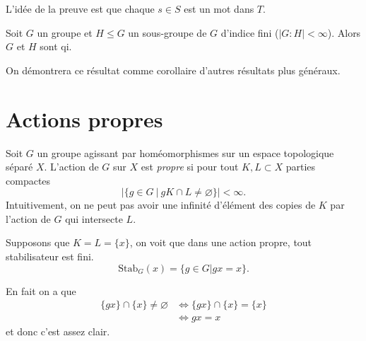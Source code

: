   \begin{preuve}
    L'idée de la preuve est que chaque $s \in S$ est un mot dans $T$.
  \end{preuve}


  \begin{prop}
    Soit $G$ un groupe et $H \leq G$ un sous-groupe de $G$ d'indice fini ($|G:H| < \infty$). Alors $G$ et $H$
    sont qi.
  \end{prop}

  \begin{preuve}
    On démontrera ce résultat comme corollaire d'autres résultats plus généraux.
  \end{preuve}

  
  
  \section{Actions propres}
  \label{sec:actions-propres}

  \begin{defi}
    Soit $G$ un groupe agissant par homéomorphismes sur un espace topologique séparé $X$. L'action de $G$ sur
    $X$ est \emph{propre}  si pour tout $K, L \subset X$ parties compactes 
      \[\left| \{g \in G\ |\ gK \cap L \neq \varnothing \}\right| < \infty.\]
    Intuitivement, on ne peut pas avoir une infinité d'élément des copies de $K$ par l'action de $G$ qui
    intersecte $L$.
  \end{defi}

  \begin{prop}
    Supposons que $K = L = \{x\}$, on voit que dans une action propre, tout stabilisateur est fini.
      \[\mathrm{Stab}_G(x) = \{g \in G | gx = x\}.\]
  \end{prop}

  \begin{preuve}
    En fait on a que
    {
      \begin{align*}
        \{gx\} \cap \{x\} \neq \varnothing &\iff \{gx\} \cap \{x\} = \{x\}\\
        & \iff gx = x
      \end{align*}}
    et donc c'est assez clair.
  \end{preuve}


